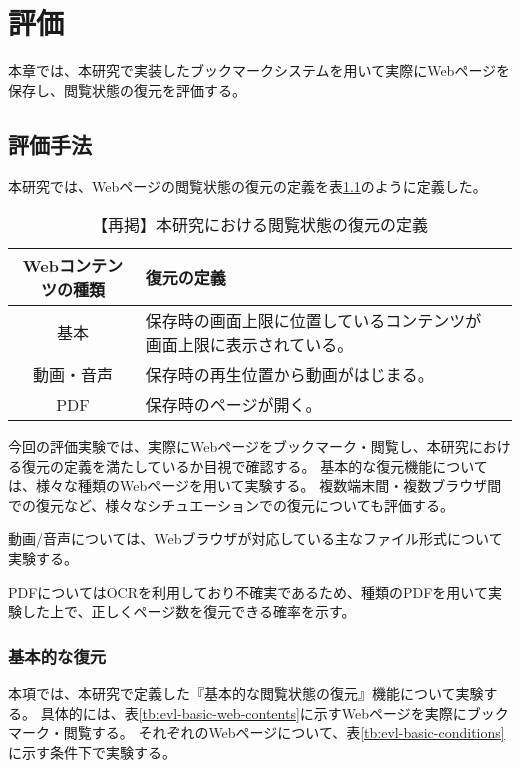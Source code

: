 \chapter{評価}
\label{chap:evaluation}
本章では、本研究で実装したブックマークシステムを用いて実際にWebページを保存し、閲覧状態の復元を評価する。

\section{評価手法}
本研究では、Webページの閲覧状態の復元の定義を表\ref{tb:restore-definition}のように定義した。

\begin{table}[htbp]
  \begin{center}
    \caption{【再掲】本研究における閲覧状態の復元の定義}
    \label{tb:restore-definition}
    \begin{tabular}{|c|l|l|}
      \hline
      Webコンテンツの種類 & 復元の定義 \\\hline\hline
      基本 & 保存時の画面上限に位置しているコンテンツが画面上限に表示されている。 \\\hline
      動画・音声 & 保存時の再生位置から動画がはじまる。 \\\hline
      PDF & 保存時のページが開く。 \\\hline
    \end{tabular}
  \end{center}
\end{table}

今回の評価実験では、実際にWebページをブックマーク・閲覧し、本研究における復元の定義を満たしているか目視で確認する。
基本的な復元機能については、様々な種類のWebページを用いて実験する。
複数端末間・複数ブラウザ間での復元など、様々なシチュエーションでの復元についても評価する。

動画/音声については、Webブラウザが対応している主なファイル形式について実験する。

PDFについてはOCRを利用しており不確実であるため、種類のPDFを用いて実験した上で、正しくページ数を復元できる確率を示す。

\subsection{基本的な復元}
本項では、本研究で定義した『基本的な閲覧状態の復元』機能について実験する。
具体的には、表\ref{tb:evl-basic-web-contents}に示すWebページを実際にブックマーク・閲覧する。
それぞれのWebページについて、表\ref{tb:evl-basic-conditions}に示す条件下で実験する。

